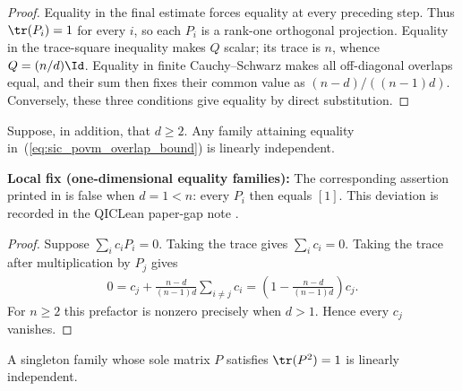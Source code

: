 \begin{proof}\leanok
    Equality in the final estimate forces equality at every preceding step.
    Thus $\tr(P_i)=1$ for every $i$, so each $P_i$ is a rank-one orthogonal
    projection. Equality in the trace-square inequality makes $Q$ scalar; its
    trace is $n$, whence $Q=(n/d)\Id$. Equality in finite
    Cauchy--Schwarz makes all off-diagonal overlaps equal, and their sum then
    fixes their common value as $(n-d)/((n-1)d)$. Conversely, these three
    conditions give equality by direct substitution.
\end{proof}

\begin{theorem}
    \label{thm:sic_povm_equality_linear_independent}
    \leanok
    Suppose, in addition, that $d\ge2$. Any family attaining equality
    in~(\ref{eq:sic_povm_overlap_bound}) is linearly independent.

    \textbf{Local fix (one-dimensional equality families):} The corresponding
    assertion printed in \cite[Chapter~2, Proposition ``SIC POVMs'',
        lines~816--823]{Wolf2012Quantum} is false when $d=1<n$: every $P_i$ then
    equals $[1]$. This deviation is recorded in the QICLean paper-gap note
    \cite{gap:wolf_sic_povm_linear_independence}.
\end{theorem}

\begin{proof}\leanok
    Suppose $\sum_i c_iP_i=0$. Taking the trace gives $\sum_i c_i=0$.
    Taking the trace after multiplication by $P_j$ gives
    \begin{align}
        0
        =c_j+\frac{n-d}{(n-1)d}\sum_{i\ne j}c_i
        =\left(1-\frac{n-d}{(n-1)d}\right)c_j.
    \end{align}
    For $n\ge2$ this prefactor is nonzero precisely when $d>1$. Hence every
    $c_j$ vanishes.
\end{proof}

\begin{theorem}
    \label{thm:sic_povm_singleton_linear_independent}
    \leanok
    A singleton family whose sole matrix $P$ satisfies $\tr(P^2)=1$ is
    linearly independent.
\end{theorem}

